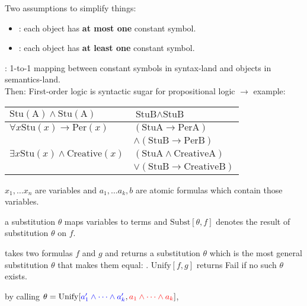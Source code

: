 Two assumptions to simplify things:
\begin{itemize}
    \item {}: each object has \textbf{at most one} constant symbol.
    \item {}: each object has \textbf{at least one} constant symbol.
\end{itemize}
: 1-to-1 mapping between constant symbols in syntax-land
and objects in semantics-land.\\
Then: First-order logic is syntactic sugar for propositional logic $\rightarrow$
 example:
\begin{tabular}{l|l}
    \hline
    $\text{Stu}(\text{A}) \wedge \text{Stu}(\text{A})$ & $\text{StuB} \wedge \text{StuB}$ \\ 
    \hline
    $\forall x \text{Stu}(x) \rightarrow \text{Per}(x)$ & $(\text{StuA} \rightarrow \text{PerA})$\\
    & $\wedge (\text{StuB} \rightarrow \text{PerB})$ \\
    \hline
    $\exists x \text{Stu}(x) \wedge \text{Creative}(x)$ & $(\text{StuA} \wedge \text{CreativeA})$\\
    & $\vee (\text{StuB} \rightarrow \text{CreativeB})$ \\
    \hline
\end{tabular}

$x_1, \dots x_n$ are variables and $a_1, \dots a_k, b$ are atomic formulas which
contain those variables.

 a substitution $\theta$ maps variables to terms and
$\text{Subst}[\theta, f]$ denotes the result of substitution $\theta$ on $f$.

 takes two formulas $f$ and $g$ and returns a substitution $\theta$
which is the most general substitution $\theta$ that makes them equal:
.
$\text{Unify}[f,g]$ returns Fail if no such $\theta$ exists.

 by calling
$\theta = \text{Unify}[\textcolor{blue}{a'_1 \wedge \dots \wedge a'_k}, \textcolor{red}{a_1 \wedge \dots \wedge a_k}]$,

